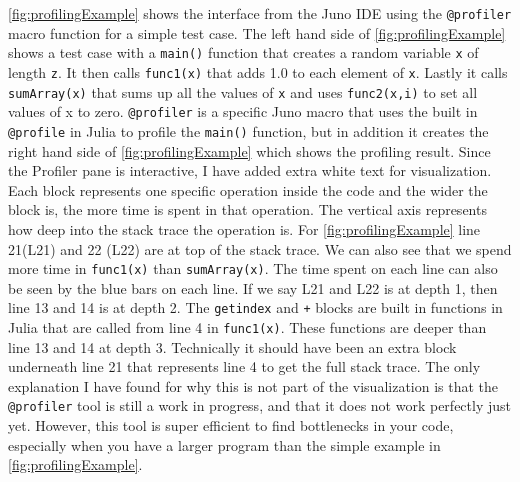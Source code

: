 \autoref{fig:profilingExample} shows the interface from the Juno IDE using the \texttt{@profiler} macro function \emph{\citep{JunoProfilerMacro}} for a simple test case. The left hand side of \autoref{fig:profilingExample} shows a test case with a \texttt{main()} function that creates a random variable \texttt{x} of length \texttt{z}. It then  calls  \texttt{func1(x)} that adds 1.0 to each element of \texttt{x}. Lastly it calls \texttt{sumArray(x)} that sums up all the values of \texttt{x} and uses \texttt{func2(x,i)} to set all values of x to zero. \texttt{@profiler} is a specific Juno macro that uses the built in \texttt{@profile} in Julia \emph{\citep{Profile.jl}} to profile the \texttt{main()} function, but in addition it creates the right hand side of \autoref{fig:profilingExample} which shows the profiling result. Since the Profiler pane is interactive, I have added extra white text for visualization. Each block represents one specific operation inside the code and the wider the block is, the more time is spent in that operation. The vertical axis represents how deep into the stack trace the operation is. For \autoref{fig:profilingExample} line 21(L21) and 22 (L22) are at top of the stack trace. We can also see that we spend more time in \texttt{func1(x)} than \texttt{sumArray(x)}. The time spent on each line can also be seen by the blue bars on each line. If we say  L21 and L22 is at depth 1, then line 13 and 14 is at depth 2. The \texttt{getindex} and \texttt{+} blocks are built in functions in Julia that are called from line 4 in \texttt{func1(x)}. These functions are deeper than line 13 and 14 at depth 3. Technically it should have been an extra block underneath line 21 that represents line 4 to get the full stack trace. The only explanation I have found for why this is not part of the visualization is that the \texttt{@profiler} tool is still a work in progress, and that it does not work perfectly just yet. However, this tool is super efficient to find bottlenecks in your code, especially when you have a larger program than the simple example in \autoref{fig:profilingExample}. 
